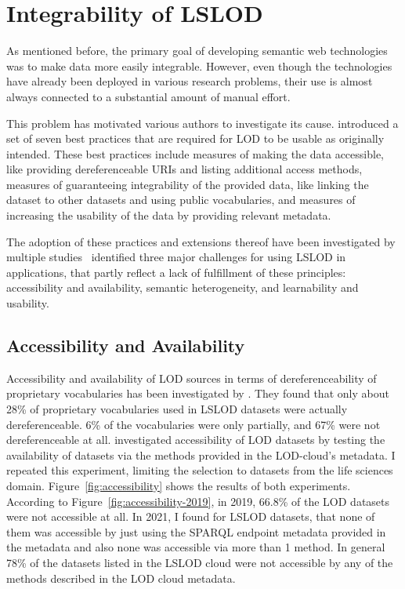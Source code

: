 \documentclass[runningheads]{llncs}
\begin{document}
    \section{Integrability of LSLOD}
    As mentioned before, the primary goal of developing semantic web technologies was to make data more easily integrable.
    However, even though the technologies have already been deployed in various research problems, their use is almost always connected to a substantial amount of manual effort.

    This problem has motivated various authors to investigate its cause.
    \citet{heath2011linked} introduced a set of seven best practices that are required for LOD to be usable as originally intended.
    These best practices include measures of making the data accessible, like providing dereferenceable URIs and listing additional access methods, measures of guaranteeing integrability of the provided data, like linking the dataset to other datasets and using public vocabularies, and measures of increasing the usability of the data by providing relevant metadata.

    The adoption of these practices and extensions thereof have been investigated by multiple studies~\citep{schmachtenberg2014adoption, debattista2018evaluating, debattista2019lod}
    \citet{kamdar2019enabling} identified three major challenges for using LSLOD in applications, that partly reflect a lack of fulfillment of these principles: accessibility and availability, semantic heterogeneity, and learnability and usability.

    \subsection{Accessibility and Availability}
    Accessibility and availability of LOD sources in terms of dereferenceability of proprietary vocabularies has been investigated by \citet{schmachtenberg2014adoption}.
    They found that only about 28\% of proprietary vocabularies used in LSLOD datasets were actually dereferenceable.
    6\% of the vocabularies were only partially, and 67\% were not dereferenceable at all.
    \citet{debattista2019lod} investigated accessibility of LOD datasets by testing the availability of datasets via the methods provided in the LOD-cloud's metadata.
    I repeated this experiment, limiting the selection to datasets from the life sciences domain.
    Figure~\ref{fig:accessibility} shows the results of both experiments.
    According to Figure~\ref{fig:accessibility-2019}, in 2019, 66.8\% of the LOD datasets were not accessible at all.
    In 2021, I found for LSLOD datasets, that none of them was accessible by just using the SPARQL endpoint metadata provided in the metadata and also none was accessible via more than 1 method.
    In general 78\% of the datasets listed in the LSLOD cloud were not accessible by any of the methods described in the LOD cloud metadata.
\end{document}
